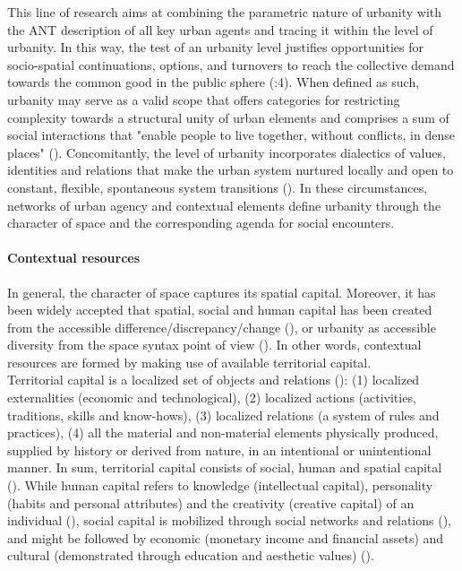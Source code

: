 \documentclass[11pt]{report}
\begin{document}
{{{This line of research aims at combining the parametric nature of urbanity with the ANT description of all key urban agents and tracing it within the level of urbanity. In this way, the test of an urbanity level justifies opportunities for socio-spatial continuations, options, and turnovers to reach the collective demand towards the common good in the public sphere (\href{Holden}{\citealt{holden_justifying_2015}}:4). 
When defined as such, urbanity may serve as a valid scope that offers categories for restricting complexity towards a structural unity of urban elements and comprises a sum of social interactions that "enable people  to  live  together,  without  conflicts,  in  dense places"
(\citealt{Bisson 2016}).
Concomitantly, the level of urbanity incorporates dialectics of values, identities and relations that make the urban system nurtured locally and open to constant, flexible, spontaneous system transitions (\href{Groth}{\citealt{groth_reclaiming_2005}}).
In these circumstances, networks of urban agency and contextual elements define urbanity through the character of space and the corresponding agenda for social encounters.

\paragraph{Contextual resources}

In general, the character of space captures its spatial capital. 
Moreover, it has been widely accepted that spatial, social and human capital has been created from the accessible difference/discrepancy/change (\cite{(Becker 1993})\href{Coleman}{\citealt{coleman_social_1988}}, or urbanity as accessible diversity from the space syntax point of view (\href{Marcus}{\citealt{marcus_spatial_2007}}). In other words, contextual resources are formed by making use of available territorial capital.
\\

Territorial capital is a localized set of objects and relations (\href{Camagni}{\citealt{camagni_regional_2013}}):
(1) localized externalities (economic and technological),
(2) localized actions (activities, traditions, skills and know-hows),
(3) localized relations (a system of rules and practices),
(4) all the material and non-material elements physically produced, supplied by history or derived from nature, in an intentional or unintentional manner. In sum, territorial capital consists of social, human and spatial capital  (\href{Gronlund}{\citealt{gronlund_notions_2007}}).
While human capital refers to knowledge (intellectual capital), personality (habits and personal attributes) and the creativity (creative capital) of an individual (\href{Becker}{\citealt{becker_human_1993}}), social capital is mobilized through social networks and relations (\citealt{Bourdieu 1986}), and might be followed by economic (monetary income and  financial  assets) and cultural (demonstrated through education and aesthetic values) (\citealt{Rerat and Lees 2011}).
\\

}}}
\end{document}
